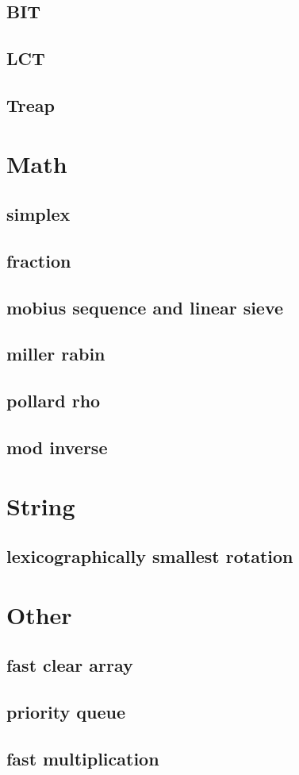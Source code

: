 \documentclass[a4paper,10pt,twocolumn,oneside]{article}
\begin{document}
\subsection{BIT}

\subsection{LCT}

\subsection{Treap}


\section{Math}
\subsection{simplex}

\subsection{fraction}

\subsection{mobius sequence and linear sieve}

\subsection{miller rabin}

\subsection{pollard rho}

\subsection{mod inverse}


\section{String}
\subsection{lexicographically smallest rotation}


\section{Other}
\subsection{fast clear array}

\subsection{priority queue}

\subsection{fast multiplication}

\end{document}
